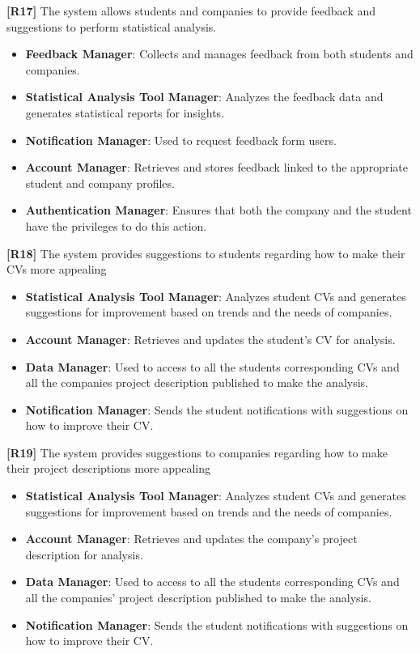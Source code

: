 \textbf{[R17]} The system allows students and companies to provide feedback and suggestions to perform statistical analysis.
\begin{itemize}
    \item \textbf{Feedback Manager}: Collects and manages feedback from both students and companies.
    \item \textbf{Statistical Analysis Tool Manager}: Analyzes the feedback data and generates statistical reports for insights.
    \item \textbf{Notification Manager}: Used to request feedback form users.
    \item \textbf{Account Manager}: Retrieves and stores feedback linked to the appropriate student and company profiles.
    \item \textbf{Authentication Manager}: Ensures that both the company and the student have the privileges to do this action.
    
\end{itemize}
\textbf{[R18] }The system provides suggestions to students regarding how to make their CVs more appealing
\begin{itemize}
    \item \textbf{Statistical Analysis Tool Manager}: Analyzes student CVs and generates suggestions for improvement based on trends and the needs of companies.
    \item \textbf{Account Manager}: Retrieves and updates the student’s CV for analysis.
     \item \textbf{Data Manager}: Used to access to all the students corresponding CVs and all the companies project description published to make the analysis. 
    \item \textbf{Notification Manager}: Sends the student notifications with suggestions on how to improve their CV.

\end{itemize}
\textbf{[R19]} The system provides suggestions to companies regarding how to make their project descriptions more appealing
\begin{itemize}
    \item \textbf{Statistical Analysis Tool Manager}: Analyzes student CVs and generates suggestions for improvement based on trends and the needs of companies.
    \item \textbf{Account Manager}: Retrieves and updates the company's project description for analysis.
     \item \textbf{Data Manager}: Used to access to all the students corresponding CVs and all the companies' project description published to make the analysis. 
    \item \textbf{Notification Manager}: Sends the student notifications with suggestions on how to improve their CV.
\end{itemize}

